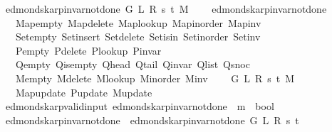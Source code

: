 \begin{isabellebody}
\ \ {\isachardoublequoteopen}edmonds{\isacharunderscore}{\kern0pt}karp{\isacharunderscore}{\kern0pt}invar{\isacharunderscore}{\kern0pt}not{\isacharunderscore}{\kern0pt}done{\isacharunderscore}{\kern0pt}{}{\isacharprime}{\kern0pt}\ G\ L\ R\ s\ t\ M\ {\isasymequiv}\isanewline
\ \ \ edmonds{\isacharunderscore}{\kern0pt}karp{\isacharunderscore}{\kern0pt}invar{\isacharunderscore}{\kern0pt}not{\isacharunderscore}{\kern0pt}done{\isacharunderscore}{\kern0pt}{}\isanewline
\ \ \ \ Map{\isacharunderscore}{\kern0pt}empty\ Map{\isacharunderscore}{\kern0pt}delete\ Map{\isacharunderscore}{\kern0pt}lookup\ Map{\isacharunderscore}{\kern0pt}inorder\ Map{\isacharunderscore}{\kern0pt}inv\isanewline
\ \ \ \ Set{\isacharunderscore}{\kern0pt}empty\ Set{\isacharunderscore}{\kern0pt}insert\ Set{\isacharunderscore}{\kern0pt}delete\ Set{\isacharunderscore}{\kern0pt}isin\ Set{\isacharunderscore}{\kern0pt}inorder\ Set{\isacharunderscore}{\kern0pt}inv\isanewline
\ \ \ \ P{\isacharunderscore}{\kern0pt}empty\ P{\isacharunderscore}{\kern0pt}delete\ P{\isacharunderscore}{\kern0pt}lookup\ P{\isacharunderscore}{\kern0pt}invar\isanewline
\ \ \ \ Q{\isacharunderscore}{\kern0pt}empty\ Q{\isacharunderscore}{\kern0pt}is{\isacharunderscore}{\kern0pt}empty\ Q{\isacharunderscore}{\kern0pt}head\ Q{\isacharunderscore}{\kern0pt}tail\ Q{\isacharunderscore}{\kern0pt}invar\ Q{\isacharunderscore}{\kern0pt}list\ Q{\isacharunderscore}{\kern0pt}snoc\isanewline
\ \ \ \ M{\isacharunderscore}{\kern0pt}empty\ M{\isacharunderscore}{\kern0pt}delete\ M{\isacharunderscore}{\kern0pt}lookup\ M{\isacharunderscore}{\kern0pt}inorder\ M{\isacharunderscore}{\kern0pt}inv\isanewline
\ \ \ \ G\ L\ R\ s\ t\ M\isanewline
\ \ \ \ Map{\isacharunderscore}{\kern0pt}update\ P{\isacharunderscore}{\kern0pt}update\ M{\isacharunderscore}{\kern0pt}update{\isachardoublequoteclose}\isanewline
\isanewline
{}\isamarkupfalse%
\ {\isacharparenleft}{\kern0pt}\ edmonds{\isacharunderscore}{\kern0pt}karp{\isacharunderscore}{\kern0pt}valid{\isacharunderscore}{\kern0pt}input{\isacharparenright}{\kern0pt}\ edmonds{\isacharunderscore}{\kern0pt}karp{\isacharunderscore}{\kern0pt}invar{\isacharunderscore}{\kern0pt}not{\isacharunderscore}{\kern0pt}done{\isacharunderscore}{\kern0pt}{}{\isacharprime}{\kern0pt}{\isacharprime}{\kern0pt}\ {\isacharcolon}{\kern0pt}{\isacharcolon}{\kern0pt}\ {\isachardoublequoteopen}{\isacharprime}{\kern0pt}m\ {\isasymRightarrow}\ bool{\isachardoublequoteclose}\ \isanewline
\ \ {\isachardoublequoteopen}edmonds{\isacharunderscore}{\kern0pt}karp{\isacharunderscore}{\kern0pt}invar{\isacharunderscore}{\kern0pt}not{\isacharunderscore}{\kern0pt}done{\isacharunderscore}{\kern0pt}{}{\isacharprime}{\kern0pt}{\isacharprime}{\kern0pt}\ {\isasymequiv}\ edmonds{\isacharunderscore}{\kern0pt}karp{\isacharunderscore}{\kern0pt}invar{\isacharunderscore}{\kern0pt}not{\isacharunderscore}{\kern0pt}done{\isacharunderscore}{\kern0pt}{}{\isacharprime}{\kern0pt}\ G\ L\ R\ s\ t{\isachardoublequoteclose}\isanewline

\end{isabellebody}
